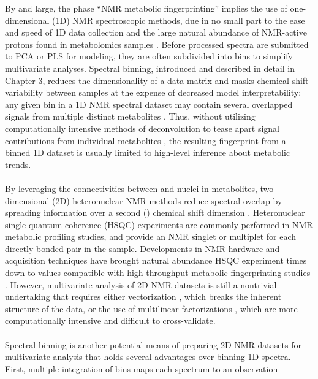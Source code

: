 \begin{doublespace}
By and large, the phase ``NMR metabolic fingerprinting'' implies the use of
one-dimensional (1D) \hnmr NMR spectroscopic methods, due in no small part to
the ease and speed of 1D data collection and the large natural abundance of
NMR-active protons found in metabolomics samples
\cite{lindon:cmr2000,worley:cmb2013}. Before processed spectra are
submitted to PCA or PLS for modeling, they are often subdivided into bins
to simplify multivariate analyses. Spectral binning, introduced and described
in detail in \hyperlink{chapter.3}{Chapter 3}, reduces the dimensionality of
a data matrix and masks chemical shift variability between samples at the
expense of decreased model interpretability: any given bin in a 1D \hnmr NMR
spectral dataset may contain several overlapped signals from multiple distinct
metabolites \cite{aberg:abc2009}. Thus, without utilizing
computationally intensive methods of deconvolution to tease apart signal
contributions from individual metabolites
\cite{astle:jasa2012,zheng:binf2011}, the resulting fingerprint from a
binned 1D dataset is usually limited to high-level inference about metabolic
trends.
\\\\
By leveraging the connectivities between \hnmr and \cnmr nuclei in metabolites,
two-dimensional (2D) heteronuclear NMR methods reduce spectral overlap by
spreading \hnmr information over a second (\cnmr) chemical shift dimension
\cite{mandal:cmr2004}. Heteronuclear single quantum coherence (HSQC)
experiments are commonly performed in NMR metabolic profiling studies, and
provide an NMR singlet or multiplet for each directly bonded \hcnmr pair
in the sample. Developments in NMR hardware and acquisition techniques have
brought natural abundance \hcnmr HSQC experiment times down to values
compatible with high-throughput metabolic fingerprinting studies
\cite{motta:anchem2010,rai:anchem2012}. However, multivariate analysis
of 2D NMR datasets is still a nontrivial undertaking that requires either
vectorization \cite{hedenstrom:cils2008}, which breaks the inherent
structure of the data, or the use of multilinear factorizations
\cite{lu:ieee2009,lu:pr2011}, which are more computationally intensive
and difficult to cross-validate.
\\\\
Spectral binning is another potential means of preparing 2D NMR datasets for
multivariate analysis that holds several advantages over binning 1D spectra.
First, multiple integration of bins maps each spectrum to an observation

\end{doublespace}
